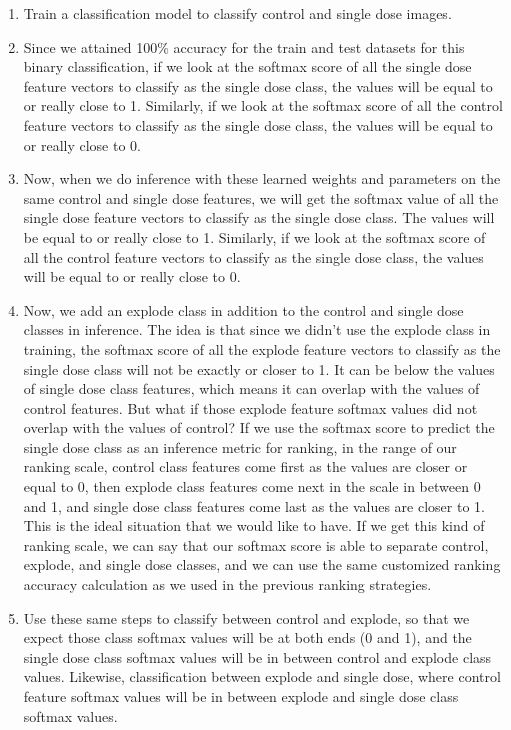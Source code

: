 \begin{enumerate}
  \item Train a classification model to classify control and single dose images.
  \item Since we attained 100\% accuracy for the train and test datasets for this binary classification, if we look at the softmax score of all the single dose feature vectors to classify as the single dose class, the values will be equal to or really close to 1. Similarly, if we look at the softmax score of all the control feature vectors to classify as the single dose class, the values will be equal to or really close to 0.
  \item Now, when we do inference with these learned weights and parameters on the same control and single dose features, we will get the softmax value of all the single dose feature vectors to classify as the single dose class. The values will be equal to or really close to 1. Similarly, if we look at the softmax score of all the control feature vectors to classify as the single dose class, the values will be equal to or really close to 0.
  \item Now, we add an explode class in addition to the control and single dose classes in inference. The idea is that since we didn't use the explode class in training, the softmax score of all the explode feature vectors to classify as the single dose class will not be exactly or closer to 1. It can be below the values of single dose class features, which means it can overlap with the values of control features. But what if those explode feature softmax values did not overlap with the values of control? If we use the softmax score to predict the single dose class as an inference metric for ranking, in the range of our ranking scale, control class features come first as the values are closer or equal to 0, then explode class features come next in the scale in between 0 and 1, and single dose class features come last as the values are closer to 1. This is the ideal situation that we would like to have. If we get this kind of ranking scale, we can say that our softmax score is able to separate control, explode, and single dose classes, and we can use the same customized ranking accuracy calculation as we used in the previous ranking strategies.
  \item Use these same steps to classify between control and explode, so that we expect those class softmax values will be at both ends (0 and 1), and the single dose class softmax values will be in between control and explode class values. Likewise, classification between explode and single dose, where control feature softmax values will be in between explode and single dose class softmax values.
\end{enumerate}


